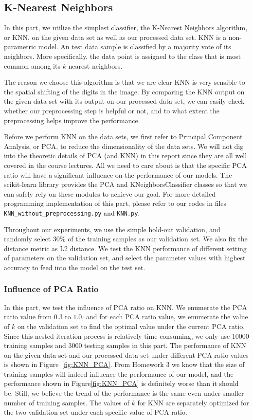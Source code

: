 \documentclass{article}
\begin{document}
\subsection{K-Nearest Neighbors}
In this part, we utilize the simplest classifier, the K-Nearest Neighbors algorithm, or KNN, on the given data set as well as our processed data set. KNN is a non-parametric model. An test data sample is classified by a majority vote of its neighbors. More specifically, the data point is assigned to the class that is most common among its $k$ nearest neighbors. 

The reason we choose this algorithm is that we are clear KNN is very sensible to the spatial shifting of the digits in the image. By comparing the KNN output on the given data set with its output on our processed data set, we can easily check whether our preprocessing step is helpful or not, and to what extent the preprocessing helps improve the performance. 

Before we perform KNN on the data sets, we first refer to Principal Component Analysis, or PCA, to reduce the dimensionality of the data sets. We will not dig into the theoretic details of PCA (and KNN) in this report since they are all well covered in the course lectures. All we need to care about is that the specific PCA ratio will have a significant influence on the performance of our models. The scikit-learn library provides the PCA and KNeighborsClassifier classes so that we can safely rely on these modules to achieve our goal. For more detailed programming implementation of this part, please refer to our codes in files \texttt{KNN\_without\_preprocessing.py} and \texttt{KNN.py}.

Throughout our experiments, we use the simple hold-out validation, and randomly select 30\% of the training samples as our validation set. We also fix the distance metric as L2 distance. We test the KNN performance of different setting of parameters on the validation set, and select the parameter values with highest accuracy to feed into the model on the test set.

\subsubsection{Influence of PCA Ratio}
In this part, we test the influence of PCA ratio on KNN. We enumerate the PCA ratio value from $0.3$ to $1.0$, and for each PCA ratio value, we enumerate the value of $k$ on the validation set to find the optimal value under the current PCA ratio. Since this nested iteration process is relatively time consuming, we only use 10000 training samples and 3000 testing samples in this part. The performance of KNN on the given data set and our processed data set under different PCA ratio values is shown in Figure~\ref{fig:KNN_PCA}. From Homework 3 we know that the size of training samples will indeed influence the performance of our model, and the performance shown in Figure\ref{fig:KNN_PCA} is definitely worse than it should be. Still, we believe the trend of the performance is the same even under smaller number of training samples. The values of $k$ for KNN are separately optimized for the two validation set under each specific value of PCA ratio. 
\end{document}
